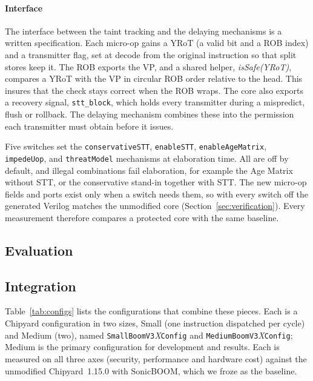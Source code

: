 \paragraph{Interface}
The interface between the taint tracking and the delaying mechanisms is a written specification.
Each micro-op gains a YRoT (a valid bit and a ROB index) and a transmitter flag, set at 
decode from the original instruction so that split stores keep it. The ROB exports the VP, 
and a shared helper, \textit{isSafe(YRoT)}, compares a YRoT with the VP in
circular ROB order relative to the head. This insures that the check stays correct when the
ROB wraps. The core also exports a recovery signal, \texttt{stt\_block}, which
holds every transmitter during a mispredict, flush or rollback. The delaying mechanism
combines these into the permission each transmitter must obtain before it issues.

Five switches set the
\texttt{conservativeSTT}, \texttt{enableSTT}, \texttt{enableAgeMatrix},
\texttt{impedeUop}, and \texttt{threatModel} mechanisms at elaboration time. 
All are off by default, and illegal combinations fail elaboration, for example the 
Age Matrix without STT, or the conservative stand-in together with STT. The new 
micro-op fields and ports exist only when a switch needs them, so with every switch 
off the generated Verilog matches the unmodified core (Section~\ref{sec:verification}). 
Every measurement therefore compares a protected core with the same baseline.



\subsection{Evaluation}




\subsection{Integration}
Table~\ref{tab:configs} lists the configurations that combine these pieces.
Each is a Chipyard configuration in two sizes, Small (one instruction
dispatched per cycle) and Medium (two), named
\texttt{SmallBoomV3}\textit{X}\texttt{Config} and
\texttt{MediumBoomV3}\textit{X}\texttt{Config}; Medium is the primary
configuration for development and results. Each is measured on all three axes
(security, performance and hardware cost) against the unmodified Chipyard~1.15.0
with SonicBOOM, which we froze as the baseline.

